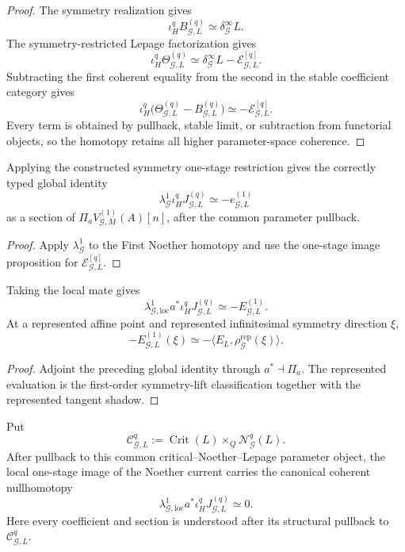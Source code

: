 \begin{proof}
The symmetry realization gives
\[
\iota_H^qB_{\mathcal G,L}^{(q)}
\simeq
\delta_{\mathcal G}^{\infty}L.
\]
The symmetry-restricted Lepage factorization gives
\[
\iota_H^q\Theta_{\mathcal G,L}^{(q)}
\simeq
\delta_{\mathcal G}^{\infty}L-\mathscr E_{\mathcal G,L}^{[q]}.
\]
Subtracting the first coherent equality from the second in the stable coefficient
category gives
\[
\iota_H^q
\bigl(\Theta_{\mathcal G,L}^{(q)}-B_{\mathcal G,L}^{(q)}\bigr)
\simeq
-\mathscr E_{\mathcal G,L}^{[q]}.
\]
Every term is obtained by pullback, stable limit, or subtraction from functorial
objects, so the homotopy retains all higher parameter-space coherence.
\end{proof}

\begin{corollary}
\label{cor:symmetry-noether-global-one-stage-euler-identity}
Applying the constructed symmetry one-stage restriction gives the correctly typed
global identity
\[
\boxed{
\lambda_{\mathcal G}^1
\iota_H^qJ_{\mathcal G,L}^{(q)}
\simeq
-e_{\mathcal G,L}^{(1)}
}
\]
as a section of
$\Pi_aV_{\mathcal G,M}^{(1)}(A)[n]$, after the common parameter pullback.
\end{corollary}

\begin{proof}
Apply $\lambda_{\mathcal G}^1$ to the First Noether homotopy and use the
one-stage image proposition for $\mathscr E_{\mathcal G,L}^{[q]}$.
\end{proof}

\begin{corollary}
\label{cor:symmetry-noether-local-one-stage-euler-evaluation}
Taking the local mate gives
\[
\boxed{
\lambda_{\mathcal G,\mathrm{loc}}^1
a^*\iota_H^qJ_{\mathcal G,L}^{(q)}
\simeq
-E_{\mathcal G,L}^{(1)}.
}
\]
At a represented affine point and represented infinitesimal symmetry direction
$\xi$,
\[
-E_{\mathcal G,L}^{(1)}(\xi)
\simeq
-\langle E_L,\rho_{\mathcal G}^{\mathrm{rep}}(\xi)\rangle.
\]
\end{corollary}

\begin{proof}
Adjoint the preceding global identity through $a^*\dashv\Pi_a$.  The represented
evaluation is the first-order symmetry-lift classification together with the
represented tangent shadow.
\end{proof}

\begin{corollary}
\label{cor:symmetry-noether-canonical-one-stage-on-shell-conservation}
Put
\[
\mathcal C_{\mathcal G,L}^{q}
:=
\operatorname{Crit}(L)
\times_Q
\mathcal N_{\mathcal G}^{q}(L).
\]
After pullback to this common critical--Noether--Lepage parameter object, the local
one-stage image of the Noether current carries the canonical coherent
nullhomotopy
\[
\boxed{
\lambda_{\mathcal G,\mathrm{loc}}^1
 a^*\iota_H^q J_{\mathcal G,L}^{(q)}
\simeq0.
}
\]
Here every coefficient and section is understood after its structural pullback to
$\mathcal C_{\mathcal G,L}^{q}$.
\end{corollary}

